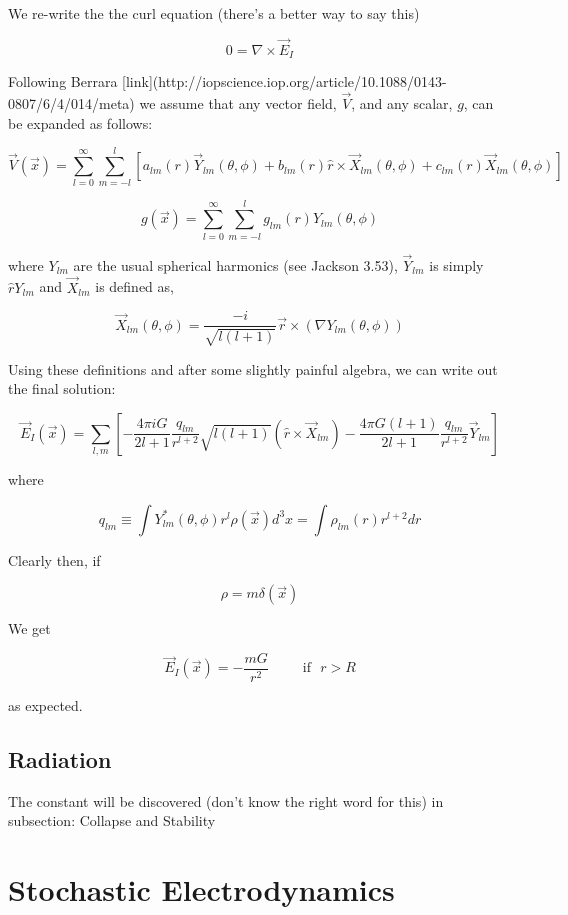 \documentclass {article}
\begin{document}
We re-write the the curl equation (there's a better way to say this)

$$ 0 = \nabla \times \vec E_I $$



Following Berrara [link](http://iopscience.iop.org/article/10.1088/0143-0807/6/4/014/meta) we assume that any vector field, $\vec V$, and any scalar, $g$, can be expanded as follows:

$$\vec V (\vec x) = \sum_{l=0}^{\infty} \sum_{m=-l}^{l} \left[a_{lm}(r) \vec Y_{lm}(\theta, \phi) +b_{lm}(r) \hat r \times \vec X_{lm} (\theta, \phi) +c_{lm}(r) \vec X_{lm} (\theta, \phi) \right] $$

$$g(\vec x) = \sum_{l=0}^{\infty} \sum_{m=-l}^{l} g_{lm}(r) Y_{lm}(\theta, \phi)$$

where $Y_{lm}$ are the usual spherical harmonics (see Jackson 3.53), $\vec Y_{lm}$ is simply $\hat r Y_{lm}$  and $\vec X_{lm}$ is defined as,

$$\vec X_{lm}(\theta, \phi) = \frac {-i}{\sqrt{l(l+1)}} \vec r \times \left( \nabla Y_{lm}(\theta, \phi) \right) $$

Using these definitions and after some slightly painful algebra, we can write out the final solution:

$$\vec E_I(\vec x) = \sum_{l,m} \left[ -\frac {4\pi i G }{2l+1} \frac {q_{lm}}{r^{l+2}} \sqrt {l(l+1)} \left(\hat r \times \vec X_{lm} \right)  - \frac {4 \pi G (l+1)}{2l+1} \frac {q_{lm}}{r^{l+2}} \vec Y_{lm} \right] $$

where

$$q_{lm} \equiv \int Y_{lm}^* (\theta, \phi) r^l \rho (\vec x ) d^3x = \int \rho_{lm} (r) r^{l+2}dr$$

Clearly then, if

$$\rho = m\delta(\vec x) $$

We get

$$\vec E_I(\vec x) = - \frac {mG} {r^2}  ~~~~~~~~~~~ \textrm{if} ~~~ r > R$$

as expected.
\newpage
\subsection{Radiation}
The constant will be discovered (don't know the right word for this) in subsection: Collapse and Stability
\newpage

\section{Stochastic Electrodynamics}
\end{document}

